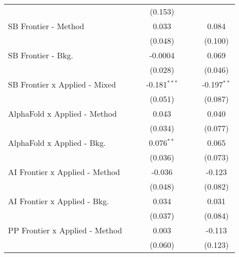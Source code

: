 \begin{tabular}{lcccccc}
                                  &              &              & (0.153)        &              &         &   \\   
   SB Frontier - Method           &              &              & 0.033          &              &         & 0.084\\   
                                  &              &              & (0.048)        &              &         & (0.100)\\   
   SB Frontier - Bkg.             &              &              & -0.0004        &              &         & 0.069\\   
                                  &              &              & (0.028)        &              &         & (0.046)\\   
   SB Frontier x Applied - Mixed  &              &              & -0.181$^{***}$ &              &         & -0.197$^{**}$\\   
                                  &              &              & (0.051)        &              &         & (0.087)\\   
   AlphaFold x Applied - Method   &              &              & 0.043          &              &         & 0.040\\   
                                  &              &              & (0.034)        &              &         & (0.077)\\   
   AlphaFold x Applied - Bkg.     &              &              & 0.076$^{**}$   &              &         & 0.065\\   
                                  &              &              & (0.036)        &              &         & (0.073)\\   
   AI Frontier x Applied - Method &              &              & -0.036         &              &         & -0.123\\   
                                  &              &              & (0.048)        &              &         & (0.082)\\   
   AI Frontier x Applied - Bkg.   &              &              & 0.034          &              &         & 0.031\\   
                                  &              &              & (0.037)        &              &         & (0.084)\\   
   PP Frontier x Applied - Method &              &              & 0.003          &              &         & -0.113\\   
                                  &              &              & (0.060)        &              &         & (0.123)\\   

\end{tabular}
